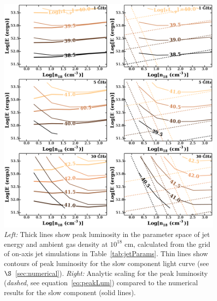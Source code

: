 \documentclass[usenatbib,fleqn]{mnras}
\begin{document}
\begin{figure}
  \includegraphics[width=16cm]{lp_contours_new.pdf}
  \caption{\label{fig:jetContours} {\it {Left:}} Thick lines show peak
    luminosity in the parameter space of jet energy and ambient gas
    density at $10^{18}$ cm, calculated from the grid of on-axis jet
    simulations in Table~\ref{tab:jetParams}. Thin lines show contours
    of peak luminosity for the slow component light curve
    (see $\S$~\ref{sec:numerical}). {\it Right:} Analytic scaling for the
    peak luminosity ({\it dashed}, see equation~\ref{eq:peakLum})
    compared to the numerical results for the slow component (solid
    lines).}
\end{figure}
\end{document}
